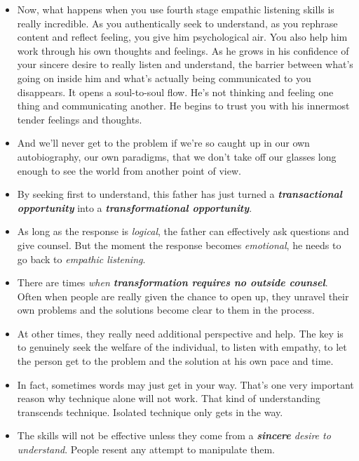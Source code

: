 \documentclass[11pt]{article}
\begin{document}
\begin{itemize}
\item Now, what happens when you use fourth stage empathic listening skills is really incredible. As you authentically seek to understand, as you rephrase content and reflect feeling, you give him psychological air. You also help him work through his own thoughts and feelings. As he grows in his confidence of your sincere desire to really listen and understand, the barrier between what's going on inside him and what's actually being communicated to you disappears. It opens a soul-to-soul flow. He's not thinking and feeling one thing and communicating another. He begins to trust you with his innermost tender feelings and thoughts.

\item And we'll never get to the problem if we're so caught up in our own autobiography, our own paradigms, that we don't take off our glasses long enough to see the world from another point of view.

\item By seeking first to understand, this father has just turned a \emph{\textbf{transactional opportunity}} into a \emph{\textbf{transformational opportunity}}.

\item As long as the response is \emph{logical}, the father can effectively ask questions and give counsel. But the moment the response becomes \emph{emotional}, he needs to go back to \emph{empathic listening}.

\item There are times \emph{when \textbf{transformation requires no outside counsel}}. Often when people are really given the chance to open up, they unravel their own problems and the solutions become clear to them in the process.

\item At other times, they really need additional perspective and help. The key is to genuinely seek the welfare of the individual, to listen with empathy, to let the person get to the problem and the solution at his own pace and time.

\item In fact, sometimes words may just get in your way. That's one very important reason why technique alone will not work. That kind of understanding transcends technique. Isolated technique only gets in the way.

\item The skills will not be effective unless they come from a \emph{\textbf{sincere} desire to understand}. People resent any attempt to manipulate them.


\end{itemize}
\end{document}
